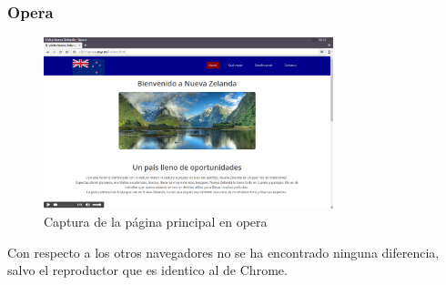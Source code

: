\subsubsection{Opera}
\begin{figure}[h]
	\centering
	\includegraphics[width=0.75\textwidth]{./Fotos/opera-capture.png}
	\caption{Captura de la página principal en opera}
	\label{fig: ejemplo}
\end{figure}
Con respecto a los otros navegadores no se ha encontrado ninguna diferencia, salvo el reproductor que es identico al de Chrome.

\clearpage
